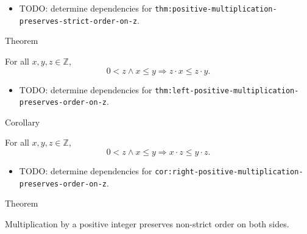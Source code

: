 \begin{dependencies}
\begin{itemize}
  \item TODO: determine dependencies for \texttt{thm:positive-multiplication-preserves-strict-order-on-z}.
\end{itemize}
\end{dependencies}

\begin{theorembox}{Theorem}
\begin{theorem}
\label{thm:left-positive-multiplication-preserves-order-on-z}
For all $x,y,z\in\mathbb{Z}$,
\[
0<z\land x\le y \Longrightarrow z\cdot x\le z\cdot y.
\]
\end{theorem}
\end{theorembox}

\begin{dependencies}
\begin{itemize}
  \item TODO: determine dependencies for \texttt{thm:left-positive-multiplication-preserves-order-on-z}.
\end{itemize}
\end{dependencies}

\begin{corollarybox}{Corollary}
\begin{corollary}
\label{cor:right-positive-multiplication-preserves-order-on-z}
For all $x,y,z\in\mathbb{Z}$,
\[
0<z\land x\le y \Longrightarrow x\cdot z\le y\cdot z.
\]
\end{corollary}
\end{corollarybox}

\begin{dependencies}
\begin{itemize}
  \item TODO: determine dependencies for \texttt{cor:right-positive-multiplication-preserves-order-on-z}.
\end{itemize}
\end{dependencies}

\begin{theorembox}{Theorem}
\begin{theorem}
\label{thm:positive-multiplication-preserves-order-on-z}
Multiplication by a positive integer preserves non-strict order on both sides.
\end{theorem}
\end{theorembox}

